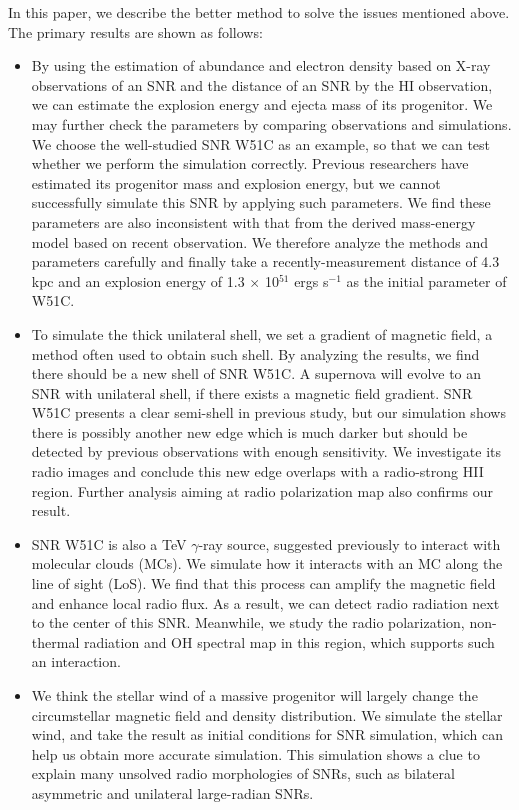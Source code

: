 In this paper, we describe the better method to solve the issues mentioned above. The primary
results are shown as follows:
\begin{itemize}
   \item By using the estimation of abundance and electron density based on X-ray observations
   of an SNR and the distance of an SNR by the HI observation, we can estimate the explosion
   energy and ejecta mass of its progenitor.
   We may further check the parameters by comparing observations and simulations.
   We choose the well-studied SNR W51C as an example, so that we can test whether we perform the
   simulation correctly.
   Previous researchers have estimated its progenitor mass and explosion energy, but we cannot
   successfully simulate this SNR by applying such parameters.
   We find these parameters are also inconsistent with that from the derived mass-energy model
   based on recent observation.
   We therefore analyze the methods and parameters carefully and finally take a recently-measurement
   distance of 4.3 kpc and an explosion energy of 1.3 $\times$ 10$^{51}$ ergs s$^{-1}$ as the
   initial parameter of W51C.

   \item To simulate the thick unilateral shell, we set a gradient of magnetic field, a method
   often used to obtain such shell.
   By analyzing the results, we find there should be a new shell of SNR W51C.
   A supernova will evolve to an SNR with unilateral shell, if there exists a magnetic field
   gradient.
   SNR W51C presents a clear semi-shell in previous study, but our simulation shows there is
   possibly another new edge which is much darker but should be detected by previous observations
   with enough sensitivity.
   We investigate its radio images and conclude this new edge overlaps with a radio-strong HII
   region.
   Further analysis aiming at radio polarization map also confirms our result.

   \item SNR W51C is also a TeV $\gamma$-ray source, suggested previously to interact with molecular
   clouds (MCs).
   We simulate how it interacts with an MC along the line of sight (LoS). We find that this process
   can amplify the magnetic field and enhance local radio flux.
   As a result, we can detect radio radiation next to the center of this SNR.
   Meanwhile, we study the radio polarization, non-thermal radiation and OH spectral map in this
   region, which supports such an interaction.

   \item We think the stellar wind of a massive progenitor will largely change the circumstellar
   magnetic field and density distribution.
   We simulate the stellar wind, and take the result as initial conditions for SNR simulation,
   which can help us obtain more accurate simulation.
   This simulation shows a clue to explain many unsolved radio morphologies of SNRs, such as
   bilateral asymmetric and unilateral large-radian SNRs.


\end{itemize}

